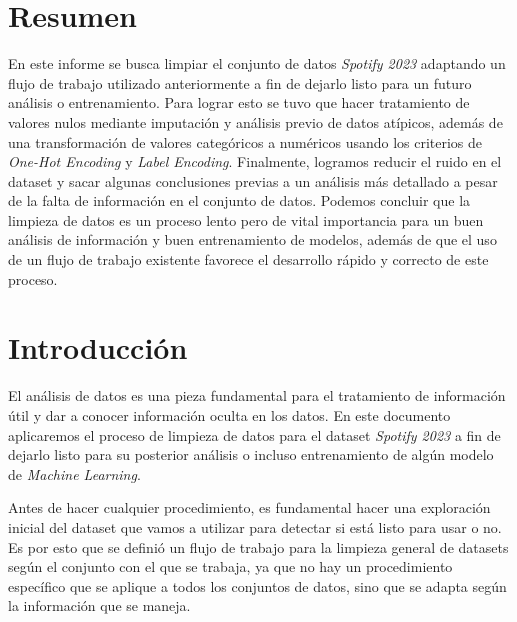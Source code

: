 \documentclass{article}
\begin{document}
	\vfill
	\newpage
	
	\tableofcontents
	\listoffigures
	\listoftables
	\thispagestyle{empty}
	\newpage
	
	\section{Resumen}
	En este informe se busca limpiar el conjunto de datos \textit{Spotify 2023} adaptando un flujo de trabajo utilizado anteriormente a fin de dejarlo listo para un futuro análisis o entrenamiento. Para lograr esto se tuvo que hacer tratamiento de valores nulos mediante imputación y análisis previo de datos atípicos, además de una transformación de valores categóricos a numéricos usando los criterios de \textit{One-Hot Encoding} y \textit{Label Encoding}. Finalmente, logramos reducir el ruido en el dataset y sacar algunas conclusiones previas a un análisis más detallado a pesar de la falta de información en el conjunto de datos. Podemos concluir que la limpieza de datos es un proceso lento pero de vital importancia para un buen análisis de información y buen entrenamiento de modelos, además de que el uso de un flujo de trabajo existente favorece el desarrollo rápido y correcto de este proceso.
	
	\section{Introducción}
	El análisis de datos es una pieza fundamental para el tratamiento de información útil y dar a conocer información oculta en los datos. En este documento aplicaremos el proceso de limpieza de datos para el dataset \textit{Spotify 2023} a fin de dejarlo listo para su posterior análisis o incluso entrenamiento de algún modelo de \textit{Machine Learning}.
	
	Antes de hacer cualquier procedimiento, es fundamental hacer una exploración inicial del dataset que vamos a utilizar para detectar si está listo para usar o no. Es por esto que se definió un flujo de trabajo para la limpieza general de datasets según el conjunto con el que se trabaja, ya que no hay un procedimiento específico que se aplique a todos los conjuntos de datos, sino que se adapta según la información que se maneja.
	
\end{document}
